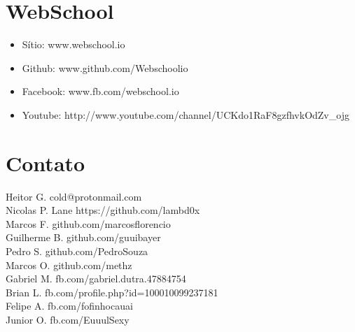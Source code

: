 \section{WebSchool}
\begin{itemize}
    \item{S\'itio: www.webschool.io}
    \item{Github: www.github.com/Webschoolio} 
    \item{Facebook: www.fb.com/webschool.io}
    \item{Youtube: http://www.youtube.com/channel/UCKdo1RaF8gzfhvkOdZv\_ojg} 
\end{itemize}

\section{Contato}
\noindent
Heitor G. cold@protonmail.com 				\\
Nicolas P. Lane https://github.com/lambd0x		\\
Marcos F. github.com/marcosflorencio	 		\\
Guilherme B. github.com/guuibayer			\\
Pedro S. github.com/PedroSouza				\\
Marcos O. github.com/methz				\\
Gabriel M. fb.com/gabriel.dutra.47884754		\\
Brian L. fb.com/profile.php?id=100010099237181		\\
Felipe A. fb.com/fofinhocauai				\\
Junior O. fb.com/EuuulSexy				\\ 



 